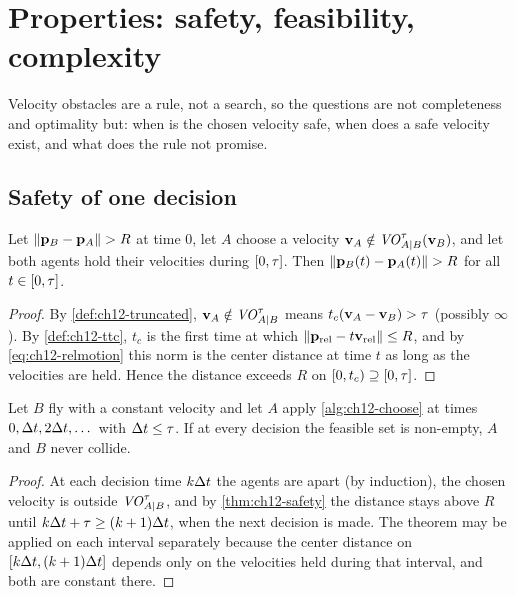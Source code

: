 \section{Properties: safety, feasibility, complexity}
\label{sec:ch12-properties}

Velocity obstacles are a rule, not a search, so the questions are not
completeness and optimality but: when is the chosen velocity safe, when does a
safe velocity exist, and what does the rule not promise.

\subsection{Safety of one decision}

\begin{theorem}
\label{thm:ch12-safety}
Let $\left\lVert \mathbf{p}_B - \mathbf{p}_A \right\rVert > R$ at time $0$, let $A$ choose a velocity
$\mathbf{v}_A \notin \mathit{VO}^{\tau}_{A|B}(\mathbf{v}_B)$, and let both agents hold their
velocities during $[0,\tau]$. Then $\left\lVert \mathbf{p}_B(t) - \mathbf{p}_A(t) \right\rVert > R$ for all
$t \in [0, \tau]$.
\end{theorem}
\begin{proof}
By \cref{def:ch12-truncated}, $\mathbf{v}_A \notin \mathit{VO}^{\tau}_{A|B}$ means
$t_c(\mathbf{v}_A - \mathbf{v}_B) > \tau$ (possibly $\infty$). By \cref{def:ch12-ttc},
$t_c$ is the first time at which $\left\lVert \mathbf{p}_{\mathrm{rel}} - t\mathbf{v}_{\mathrm{rel}} \right\rVert
\le R$, and by \cref{eq:ch12-relmotion} this norm is the center distance at time
$t$ as long as the velocities are held. Hence the distance exceeds $R$ on
$[0, t_c) \supseteq [0, \tau]$. \qedhere
\end{proof}

\begin{corollary}
\label{cor:ch12-intruder}
Let $B$ fly with a constant velocity and let $A$ apply \cref{alg:ch12-choose}
at times $0, \Delta t, 2\Delta t, \dots$ with $\Delta t \le \tau$. If at every decision the
feasible set is non-empty, $A$ and $B$ never collide.
\end{corollary}
\begin{proof}
At each decision time $k\Delta t$ the agents are apart (by induction), the chosen
velocity is outside $\mathit{VO}^{\tau}_{A|B}$, and by \cref{thm:ch12-safety} the
distance stays above $R$ until $k\Delta t + \tau \ge (k+1)\Delta t$, when the next
decision is made. The theorem may be applied on each interval separately
because the center distance on $[k\Delta t, (k+1)\Delta t]$ depends only on the
velocities held during that interval, and both are constant there. \qedhere
\end{proof}


